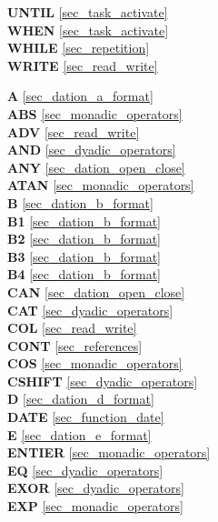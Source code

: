 {{\bf UNTIL} \ref{sec_task_activate}\\
 
{\bf WHEN} \ref{sec_task_activate}\\
{\bf WHILE} \ref{sec_repetition}\\
{\bf WRITE} \ref{sec_read_write}\\
}
\onecolumn


{
{\bf A} \ref{sec_dation_a_format}\\
{\bf ABS} \ref{sec_monadic_operators}\\
{\bf ADV} \ref{sec_read_write}\\
{\bf AND} \ref{sec_dyadic_operators}\\
{\bf ANY} \ref{sec_dation_open_close}\\
{\bf ATAN} \ref{sec_monadic_operators}\\

{\bf B} \ref{sec_dation_b_format}\\
{\bf B1} \ref{sec_dation_b_format}\\
{\bf B2} \ref{sec_dation_b_format}\\
{\bf B3} \ref{sec_dation_b_format}\\
{\bf B4} \ref{sec_dation_b_format}\\

{\bf CAN} \ref{sec_dation_open_close}\\
{\bf CAT} \ref{sec_dyadic_operators}\\
{\bf COL} \ref{sec_read_write}\\
{\bf CONT} \ref{sec_references}\\
{\bf COS} \ref{sec_monadic_operators}\\
{\bf CSHIFT} \ref{sec_dyadic_operators}\\
 
{\bf D} \ref{sec_dation_d_format}\\
{\bf DATE} \ref{sec_function_date}\\
 
{\bf E} \ref{sec_dation_e_format}\\
{\bf ENTIER} \ref{sec_monadic_operators}\\
{\bf EQ} \ref{sec_dyadic_operators}\\
{\bf EXOR} \ref{sec_dyadic_operators}\\
{\bf EXP} \ref{sec_monadic_operators}\\
 
}
